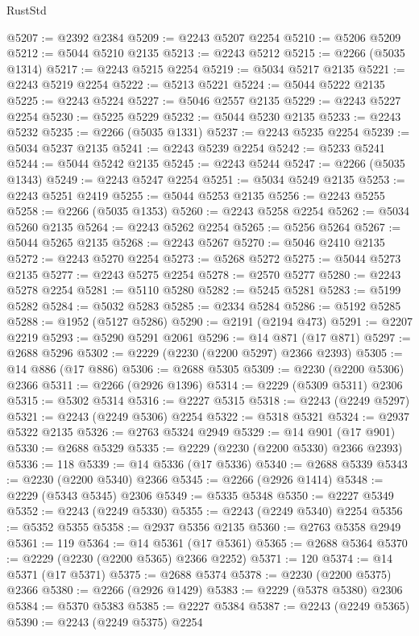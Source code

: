 \begin{lexlean}{RustStd}
\begin{coremodule}
@5207 := @2392 @2384
@5209 := @2243 @5207 @2254
@5210 := @5206 @5209
@5212 := @5044 @5210 @2135
@5213 := @2243 @5212
@5215 := @2266 (@5035 @1314)
@5217 := @2243 @5215 @2254
@5219 := @5034 @5217 @2135
@5221 := @2243 @5219 @2254
@5222 := @5213 @5221
@5224 := @5044 @5222 @2135
@5225 := @2243 @5224
@5227 := @5046 @2557 @2135
@5229 := @2243 @5227 @2254
@5230 := @5225 @5229
@5232 := @5044 @5230 @2135
@5233 := @2243 @5232
@5235 := @2266 (@5035 @1331)
@5237 := @2243 @5235 @2254
@5239 := @5034 @5237 @2135
@5241 := @2243 @5239 @2254
@5242 := @5233 @5241
@5244 := @5044 @5242 @2135
@5245 := @2243 @5244
@5247 := @2266 (@5035 @1343)
@5249 := @2243 @5247 @2254
@5251 := @5034 @5249 @2135
@5253 := @2243 @5251 @2419
@5255 := @5044 @5253 @2135
@5256 := @2243 @5255
@5258 := @2266 (@5035 @1353)
@5260 := @2243 @5258 @2254
@5262 := @5034 @5260 @2135
@5264 := @2243 @5262 @2254
@5265 := @5256 @5264
@5267 := @5044 @5265 @2135
@5268 := @2243 @5267
@5270 := @5046 @2410 @2135
@5272 := @2243 @5270 @2254
@5273 := @5268 @5272
@5275 := @5044 @5273 @2135
@5277 := @2243 @5275 @2254
@5278 := @2570 @5277
@5280 := @2243 @5278 @2254
@5281 := @5110 @5280
@5282 := @5245 @5281
@5283 := @5199 @5282
@5284 := @5032 @5283
@5285 := @2334 @5284
@5286 := @5192 @5285
@5288 := @1952 (@5127 @5286)
@5290 := @2191 (@2194 @473)
@5291 := @2207 @2219
@5293 := @5290 @5291 @2061
@5296 := @14 @871 (@17 @871)
@5297 := @2688 @5296
@5302 := @2229 (@2230 (@2200 @5297) @2366 @2393)
@5305 := @14 @886 (@17 @886)
@5306 := @2688 @5305
@5309 := @2230 (@2200 @5306) @2366
@5311 := @2266 (@2926 @1396)
@5314 := @2229 (@5309 @5311) @2306
@5315 := @5302 @5314
@5316 := @2227 @5315
@5318 := @2243 (@2249 @5297)
@5321 := @2243 (@2249 @5306) @2254
@5322 := @5318 @5321
@5324 := @2937 @5322 @2135
@5326 := @2763 @5324 @2949
@5329 := @14 @901 (@17 @901)
@5330 := @2688 @5329
@5335 := @2229 (@2230 (@2200 @5330) @2366 @2393)
@5336 := 118
@5339 := @14 @5336 (@17 @5336)
@5340 := @2688 @5339
@5343 := @2230 (@2200 @5340) @2366
@5345 := @2266 (@2926 @1414)
@5348 := @2229 (@5343 @5345) @2306
@5349 := @5335 @5348
@5350 := @2227 @5349
@5352 := @2243 (@2249 @5330)
@5355 := @2243 (@2249 @5340) @2254
@5356 := @5352 @5355
@5358 := @2937 @5356 @2135
@5360 := @2763 @5358 @2949
@5361 := 119
@5364 := @14 @5361 (@17 @5361)
@5365 := @2688 @5364
@5370 := @2229 (@2230 (@2200 @5365) @2366 @2252)
@5371 := 120
@5374 := @14 @5371 (@17 @5371)
@5375 := @2688 @5374
@5378 := @2230 (@2200 @5375) @2366
@5380 := @2266 (@2926 @1429)
@5383 := @2229 (@5378 @5380) @2306
@5384 := @5370 @5383
@5385 := @2227 @5384
@5387 := @2243 (@2249 @5365)
@5390 := @2243 (@2249 @5375) @2254

\end{coremodule}
\end{lexlean}
